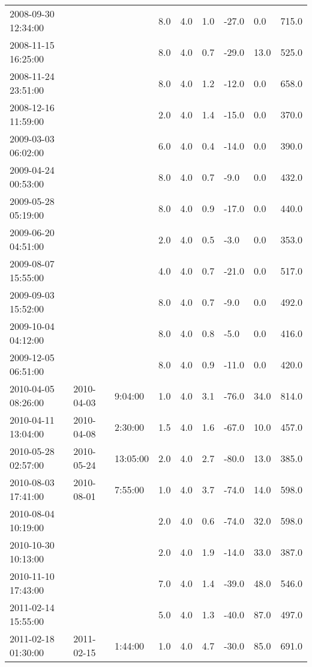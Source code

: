 \begin{longtable}{lllllllll}
        2008-09-30 12:34:00 & ~ & ~ & 8.0 & 4.0 & 1.0 & -27.0 & 0.0 & 715.0 \\ 
        2008-11-15 16:25:00 & ~ & ~ & 8.0 & 4.0 & 0.7 & -29.0 & 13.0 & 525.0 \\ 
        2008-11-24 23:51:00 & ~ & ~ & 8.0 & 4.0 & 1.2 & -12.0 & 0.0 & 658.0 \\ 
        2008-12-16 11:59:00 & ~ & ~ & 2.0 & 4.0 & 1.4 & -15.0 & 0.0 & 370.0 \\ 
        2009-03-03 06:02:00 & ~ & ~ & 6.0 & 4.0 & 0.4 & -14.0 & 0.0 & 390.0 \\ 
        2009-04-24 00:53:00 & ~ & ~ & 8.0 & 4.0 & 0.7 & -9.0 & 0.0 & 432.0 \\ 
        2009-05-28 05:19:00 & ~ & ~ & 8.0 & 4.0 & 0.9 & -17.0 & 0.0 & 440.0 \\ 
        2009-06-20 04:51:00 & ~ & ~ & 2.0 & 4.0 & 0.5 & -3.0 & 0.0 & 353.0 \\ 
        2009-08-07 15:55:00 & ~ & ~ & 4.0 & 4.0 & 0.7 & -21.0 & 0.0 & 517.0 \\ 
        2009-09-03 15:52:00 & ~ & ~ & 8.0 & 4.0 & 0.7 & -9.0 & 0.0 & 492.0 \\ 
        2009-10-04 04:12:00 & ~ & ~ & 8.0 & 4.0 & 0.8 & -5.0 & 0.0 & 416.0 \\ 
        2009-12-05 06:51:00 & ~ & ~ & 8.0 & 4.0 & 0.9 & -11.0 & 0.0 & 420.0 \\ 
        2010-04-05 08:26:00 & 2010-04-03 & 9:04:00 & 1.0 & 4.0 & 3.1 & -76.0 & 34.0 & 814.0 \\ 
        2010-04-11 13:04:00 & 2010-04-08 & 2:30:00 & 1.5 & 4.0 & 1.6 & -67.0 & 10.0 & 457.0 \\ 
        2010-05-28 02:57:00 & 2010-05-24 & 13:05:00 & 2.0 & 4.0 & 2.7 & -80.0 & 13.0 & 385.0 \\ 
        2010-08-03 17:41:00 & 2010-08-01 & 7:55:00 & 1.0 & 4.0 & 3.7 & -74.0 & 14.0 & 598.0 \\ 
        2010-08-04 10:19:00 & ~ & ~ & 2.0 & 4.0 & 0.6 & -74.0 & 32.0 & 598.0 \\ 
        2010-10-30 10:13:00 & ~ & ~ & 2.0 & 4.0 & 1.9 & -14.0 & 33.0 & 387.0 \\ 
        2010-11-10 17:43:00 & ~ & ~ & 7.0 & 4.0 & 1.4 & -39.0 & 48.0 & 546.0 \\ 
        2011-02-14 15:55:00 & ~ & ~ & 5.0 & 4.0 & 1.3 & -40.0 & 87.0 & 497.0 \\ 
        2011-02-18 01:30:00 & 2011-02-15 & 1:44:00 & 1.0 & 4.0 & 4.7 & -30.0 & 85.0 & 691.0 \\ 

\end{longtable}
